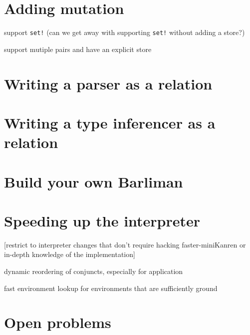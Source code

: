 \documentclass{book}
\begin{document}
\chapter{Adding mutation}%

support \verb|set!| (can we get away with supporting \verb|set!| without adding a store?)

support mutiple pairs and have an explicit store


\chapter{Writing a parser as a relation}%


\chapter{Writing a type inferencer as a relation}%


\chapter{Build your own Barliman}%


\chapter{Speeding up the interpreter}%

[restrict to interpreter changes that don't require hacking faster-miniKanren or in-depth knowledge of the implementation]

dynamic reordering of conjuncts, especially for application

fast environment lookup for environments that are sufficiently ground


\chapter{Open problems}%


\appendix
\end{document}
